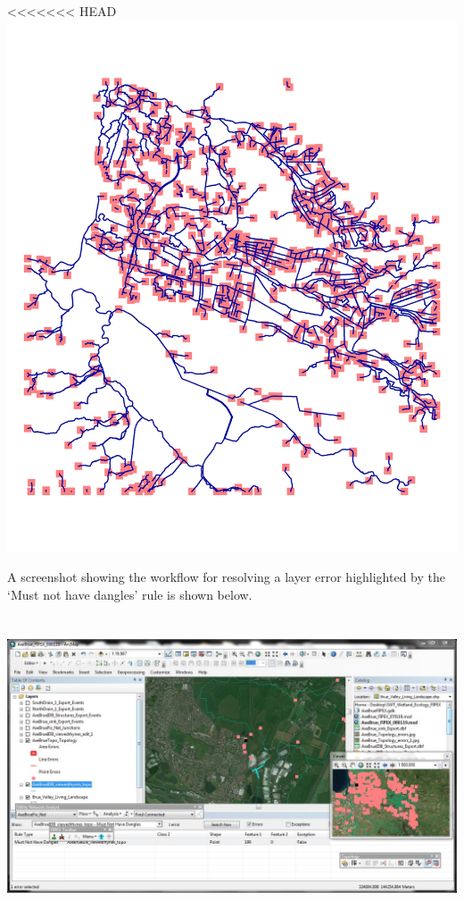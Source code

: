 \documentclass[]{article}
\begin{document}
\textless{}\textless{}\textless{}\textless{}\textless{}\textless{}\textless{}
HEAD \includegraphics{AxeBrue_Topology_errors.jpg}

A screenshot showing the workflow for resolving a layer error
highlighted by the `Must not have dangles' rule is shown below.

\hypertarget{alt-text}{%
\section{\texorpdfstring{\protect\includegraphics{AxeBrue_Topology_errors_East_of_Bridgewater_Bay.jpg}}{Alt text}}\label{alt-text}}
\end{document}
